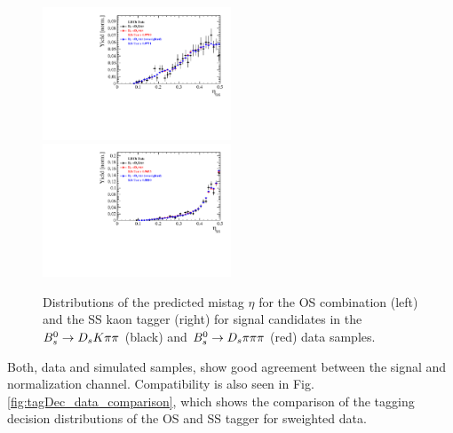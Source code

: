 
\begin{figure}[h]
\includegraphics[height=!,width=0.5\textwidth]{figs/dataVsMC/norm2signal/Ds2all_Bs_TAGOMEGA_OS.pdf}
\includegraphics[height=!,width=0.5\textwidth]{figs/dataVsMC/norm2signal/Ds2all_Bs_SS_nnetKaon_PROB.pdf}
\caption{Distributions of the predicted mistag $\eta$ for the OS combination (left) and the SS kaon tagger (right) 
for signal candidates in the ${{B}^0_{s}}\rightarrow{\ensuremath{{D}_{s}}}{\ensuremath{K}}{\ensuremath{\pi}}{\ensuremath{\pi}}$ (black) and ${{B}^0_{s}}\rightarrow{\ensuremath{{D}_{s}}}{\ensuremath{\pi}}{\ensuremath{\pi}}{\ensuremath{\pi}}$ (red) data samples.}
\label{fig:w_data_comparison}
\end{figure}

Both, data and simulated samples, show good agreement between the signal and normalization channel. 
Compatibility is also seen in Fig. \ref{fig:tagDec_data_comparison}, which shows the comparison of the tagging decision distributions of the OS and SS tagger for sweighted data. 



